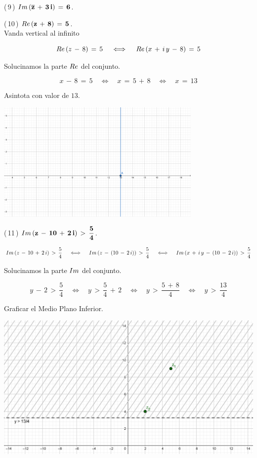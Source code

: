 \documentclass[a4paper,11pt,openany]{book}
\begin{document}
\textcolor{ao(english)}{(\,9\,)} $\bf{\mathnormal{Im}\,(\overline{z}\,+\,3\,i)\,=\,6}$.

\textcolor{ao(english)}{(\,10\,)} $\bf{\mathnormal{Re}\,(z\,+\,8)\,=\,5}$.\\
Vanda vertical al infinito

$$\mathnormal{Re}\,(z\,-\,8)\,=\,5 \quad\iff\quad  \mathnormal{Re}\,(x\,+\,i\,y\,-\,8)\,=\,5$$

\textcolor{ao(english)}{} Solucinamos la parte $\mathnormal{Re}$ del conjunto.

$$x\,-\,8\,=\,5 \quad\iff\quad x\,=\,5\,+\,8 \quad\iff\quad x\,=\,13 $$

Asintota con valor de $13$.\\

\begin{center}
    \includegraphics[width=10cm]{Gra-Ej-10.png}
\end{center}

\textcolor{ao(english)}{(\,11\,)} $\bf{\mathnormal{Im}\,(z\,-\,10\,+\,2\,i)\,>\,\dfrac{5}{4}}$.

$$\mathnormal{Im}\,(z\,-\,10\,+\,2\,i)\,>\,\dfrac{5}{4} \quad\iff\quad \mathnormal{Im}\,(z\,-\,(10\,-\,2\,i))\,>\,\dfrac{5}{4} \quad\iff\quad \mathnormal{Im}\,(x\,+\,i\,y\,-\,(10\,-\,2\,i))\,>\,\dfrac{5}{4}$$

\textcolor{ao(english)}{} Solucinamos la parte $\mathnormal{Im}$ del conjunto.

$$y\,-\,2\,>\,\dfrac{5}{4} \quad\iff\quad y\,>\,\dfrac{5}{4}\,+\,2 \quad\iff\quad y\,>\,\dfrac{5\,+\,8}{4} \quad\iff\quad y\,>\,\dfrac{13}{4}$$

\textcolor{ao(english)}{} Graficar el Medio Plano Inferior.

\begin{center}
    \includegraphics[width=15cm]{Gra-Ej-11.png}
\end{center}
\end{document}
